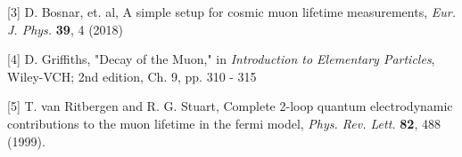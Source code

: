 \documentclass{article}
\begin{document}
[3] \hspace{1mm}  D. Bosnar, et. al, A simple setup for cosmic muon lifetime measurements, \textit{Eur. J. Phys.} \textbf{39}, 4 (2018)
\vspace{3 mm}

[4] \hspace{1mm} D. Griffiths, "Decay of the Muon," in \textit{Introduction to Elementary Particles}, Wiley-VCH; 2nd edition, Ch. 9, pp. 310 - 315

\vspace{3 mm}

[5] \hspace{1mm} T. van Ritbergen and R. G. Stuart, Complete 2-loop quantum electrodynamic contributions to the muon lifetime in the fermi model, \textit{Phys. Rev. Lett.} \textbf{82}, 488 (1999).
\end{document}
